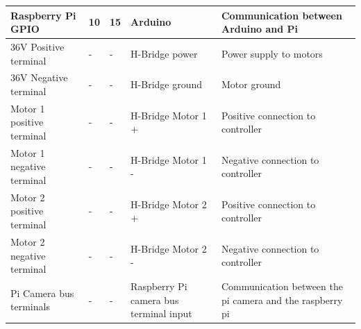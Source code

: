 \documentclass [10pt]{article}
\begin{document}
\begin{table}[]
\begin{tabular}{|l|l|l|l|l|}
			Raspberry Pi GPIO         & 10                & 15            & Arduino                                & Communication between Arduino and Pi                                                                                                                                             \\ \hline
			36V Positive terminal     & -                 & -             & H-Bridge power                         & Power supply to motors                                                                                                                                                           \\ \hline
			36V Negative terminal     & -                 & -             & H-Bridge ground                        & Motor ground                                                                                                                                                                     \\ \hline
			Motor 1 positive terminal & -                 & -             & H-Bridge Motor 1 +                     & Positive connection to controller                                                                                                                                                \\ \hline
			Motor 1 negative terminal & -                 & -             & H-Bridge Motor 1 -                     & Negative connection to controller                                                                                                                                                \\ \hline
			Motor 2 positive terminal & -                 & -             & H-Bridge Motor 2 +                     & Positive connection to controller                                                                                                                                                \\ \hline
			Motor 2 negative terminal & -                 & -             & H-Bridge Motor 2 -                     & Negative connection to controller                                                                                                                                                \\ \hline
			Pi Camera bus terminals   & -                 & -             & Raspberry Pi camera bus terminal input & Communication between the pi camera and the raspberry pi                                                                                                                         \\ \hline
		\end{tabular}
	\end{table}
\end{document}
